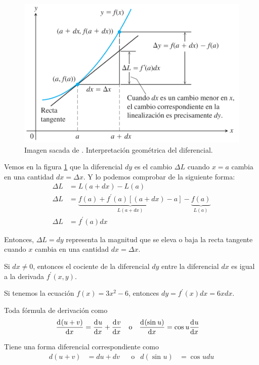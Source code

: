 \documentclass[12pt]{article}
\begin{document}
\begin{figure}[H]
  \centering
  \includegraphics[width=0.5\linewidth]{imagenes/interp_geom_diferencial.png}
  \caption{Imagen sacada de \parencite{thomas_calc_uv}. Interpretación geométrica del diferencial.}
  \label{fig:interp_geom_diferencial}
\end{figure}

Vemos en la figura \ref{fig:interp_geom_diferencial} que la diferencial $ dy $ es el cambio $ \Delta L $ cuando $ x = a $ cambia en una cantidad $ dx = \Delta x $. Y lo podemos comprobar de la siguiente forma:
\begin{align*}
  \Delta L &= L(a + dx) - L(a)\\
  \Delta L &= \underbrace{f(a) + f^{\prime}(a)\left[(a + dx) - a\right]}_{L(a + dx)} - \underbrace{f(a)}_{L(a)}\\
  \Delta L &= f^{\prime}(a)dx
\end{align*}

Entonces, $ \Delta L = dy $ representa la magnitud que se eleva o baja la recta tangente cuando $ x $ cambia en una cantidad $ dx = \Delta x $.

Si $ dx \neq 0 $, entonces el cociente de la diferencial $ dy $ entre la diferencial $ dx $ es igual a la derivada $ f^{\prime} (x,y) $.

Si tenemos la ecuación $ f(x) = 3x^{2} - 6 $, entonces $ dy = f^{\prime}(x)dx = 6xdx $.

Toda fórmula de derivación como 
\begin{align*}
	\dv[]{(u + v)}{x} &= \dv[]{u}{x} + \dv[]{v}{x} && \text{o} & \dv[]{(\sin^{}u)}{x} &= \cos^{}u\dv[]{u}{x}
\end{align*}

Tiene una forma diferencial correspondiente como 
\begin{align*}
	d(u+v) &= du+dv && \text{o} & d(\sin^{}u) &= \cos^{}udu
\end{align*}
\end{document}
